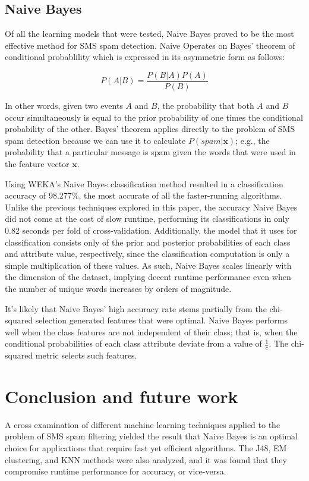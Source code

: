 \documentclass[letterpaper, 10 pt, conference]{ieeeconf}  %
\begin{document}
\subsection{Naive Bayes}
Of all the learning models that were tested, Naive Bayes proved to be
the most effective method for SMS spam detection. Naive Operates on
Bayes' theorem of conditional probablility which is expressed in its
asymmetric form as follows:

\[
P(A|B) = \frac{P(B|A)P(A)}{P(B)}
\]

In other words, given two events $A$ and $B$, the probability that
both $A$ and $B$ occur simultaneously is equal to the prior
probability of one times the conditional probability of the
other. Bayes' theorem applies directly to the problem of SMS spam
detection because we can use it to calculate $P(spam| \mathbf{x})$;
e.g., the probability that a particular message is spam given the
words that were used in the feature vector $\mathbf{x}$.

Using WEKA's Naive Bayes classification method resulted in a
classification accuracy of 98.277\%, the most accurate of all the
faster-running algorithms. Unlike the previous techniques explored in
this paper, the accuracy Naive Bayes did not come at the cost of slow
runtime, performing its classifications in only 0.82 seconds per fold
of cross-validation. Additionally, the model that it uses for
classification consists only of the prior and posterior probabilities
of each class and attribute value, respectively, since the
classification computation is only a simple multiplication of these
values. As such, Naive Bayes scales linearly with the dimension of the
dataset, implying decent runtime performance even when the number of
unique words increases by orders of magnitude.

It's likely that Naive Bayes' high accuracy rate stems partially from
the chi-squared selection generated features that were optimal. Naive
Bayes performs well when the class features are not independent of
their class; that is, when the conditional probabilities of each class
attribute deviate from a value of $\frac{1}{c}$. The chi-squared metric
selects such features.

\section{Conclusion and future work}

A cross examination of different machine learning techniques applied
to the problem of SMS spam filtering yielded the result that Naive
Bayes is an optimal choice for applications that require fast yet
efficient algorithms. The J48, EM clustering, and KNN methods were
also analyzed, and it was found that they compromise runtime
performance for accuracy, or vice-versa. 
\end{document}
